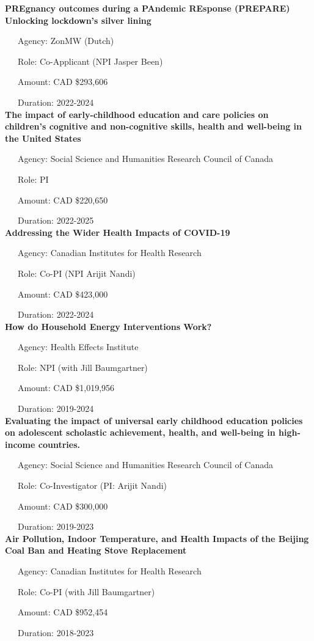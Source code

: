 \documentclass[
  letterpaper,
  DIV=11,
  numbers=noendperiod]{scrartcl}
\begin{document}
\textbf{PREgnancy outcomes during a PAndemic REsponse (PREPARE)
Unlocking lockdown's silver lining}\\
\strut ~~~Agency: ZonMW (Dutch)\\
\strut ~~~Role: Co-Applicant (NPI Jasper Been)\\
\strut ~~~Amount: CAD \$293,606\\
\strut ~~~Duration: 2022-2024\\

\textbf{The impact of early-childhood education and care policies on
children's cognitive and non-cognitive skills, health and well-being in
the United States}\\
\strut ~~~Agency: Social Science and Humanities Research Council of
Canada\\
\strut ~~~Role: PI\\
\strut ~~~Amount: CAD \$220,650\\
\strut ~~~Duration: 2022-2025\\

\textbf{Addressing the Wider Health Impacts of COVID-19}\\
\strut ~~~Agency: Canadian Institutes for Health Research\\
\strut ~~~Role: Co-PI (NPI Arijit Nandi)\\
\strut ~~~Amount: CAD \$423,000\\
\strut ~~~Duration: 2022-2024\\

\textbf{How do Household Energy Interventions Work?}\\
\strut ~~~Agency: Health Effects Institute\\
\strut ~~~Role: NPI (with Jill Baumgartner)\\
\strut ~~~Amount: CAD \$1,019,956\\
\strut ~~~Duration: 2019-2024\\

\textbf{Evaluating the impact of universal early childhood education
policies on adolescent scholastic achievement, health, and well-being in
high-income countries.}\\
\strut ~~~Agency: Social Science and Humanities Research Council of
Canada\\
\strut ~~~Role: Co-Investigator (PI: Arijit Nandi)\\
\strut ~~~Amount: CAD \$300,000\\
\strut ~~~Duration: 2019-2023\\

\textbf{Air Pollution, Indoor Temperature, and Health Impacts of the
Beijing Coal Ban and Heating Stove Replacement}\\
\strut ~~~Agency: Canadian Institutes for Health Research\\
\strut ~~~Role: Co-PI (with Jill Baumgartner)\\
\strut ~~~Amount: CAD \$952,454\\
\strut ~~~Duration: 2018-2023\\
\end{document}
